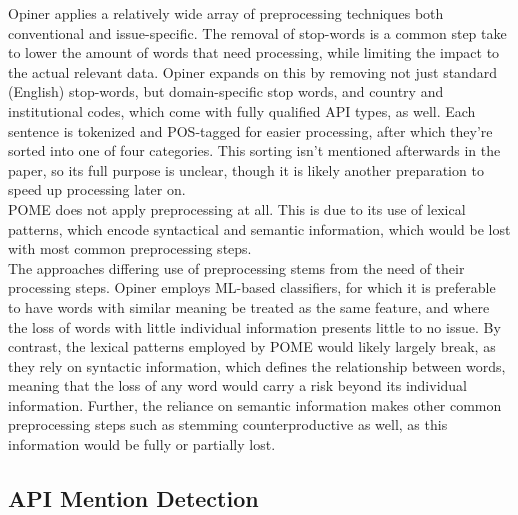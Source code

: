 \documentclass[a4paper,10pt, bibliography=totocnumbered]{scrreprt}
\begin{document}
Opiner applies a relatively wide array of preprocessing techniques both conventional and issue-specific. The removal of stop-words is a common step take to lower the amount of words that need processing, while limiting the impact to the actual relevant data. Opiner expands on this by removing not just standard (English) stop-words, but domain-specific stop words, and country and institutional codes, which come with fully qualified API types, as well. Each sentence is tokenized and POS-tagged for easier processing, after which they're sorted into one of four categories. This sorting isn't mentioned afterwards in the paper, so its full purpose is unclear, though it is likely another preparation to speed up processing later on.\\
POME does not apply preprocessing at all. This is due to its use of lexical patterns, which encode syntactical and semantic information, which would be lost with most common preprocessing steps.\\
The approaches differing use of preprocessing stems from the need of their processing steps. Opiner employs ML-based classifiers, for which it is preferable to have words with similar meaning be treated as the same feature, and where the loss of words with little individual information presents little to no issue. By contrast, the lexical patterns employed by POME would likely largely break, as they rely on syntactic information, which defines the relationship between words, meaning that the loss of any word would carry a risk beyond its individual information. Further, the reliance on semantic information makes other common preprocessing steps such as stemming counterproductive as well, as this information would be fully or partially lost.

\subsection{API Mention Detection}
\end{document}
